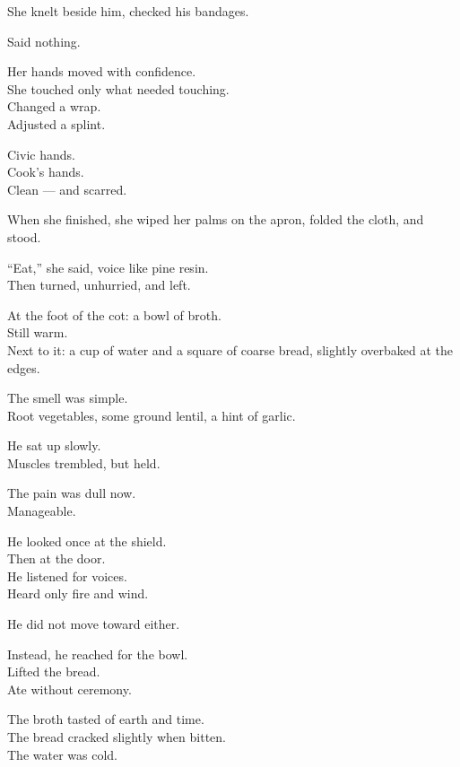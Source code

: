 \documentclass[12pt]{article}
\begin{document}
She knelt beside him, checked his bandages.

Said nothing.

\vspace{1em}

Her hands moved with confidence.\\
She touched only what needed touching.\\
Changed a wrap.\\
Adjusted a splint.

Civic hands.\\
Cook’s hands.\\
Clean — and scarred.

\vspace{1em}

When she finished, she wiped her palms on the apron, folded the cloth, and stood.

“Eat,” she said, voice like pine resin.\\
Then turned, unhurried, and left.

\vspace{1em}

At the foot of the cot: a bowl of broth.\\
Still warm.\\
Next to it: a cup of water and a square of coarse bread, slightly overbaked at the edges.

The smell was simple.\\
Root vegetables, some ground lentil, a hint of garlic.

\vspace{1em}

He sat up slowly.\\
Muscles trembled, but held.

The pain was dull now.\\
Manageable.

He looked once at the shield.\\
Then at the door.\\
He listened for voices.\\
Heard only fire and wind.

He did not move toward either.

Instead, he reached for the bowl.\\
Lifted the bread.\\
Ate without ceremony.

The broth tasted of earth and time.\\
The bread cracked slightly when bitten.\\
The water was cold.
\end{document}
